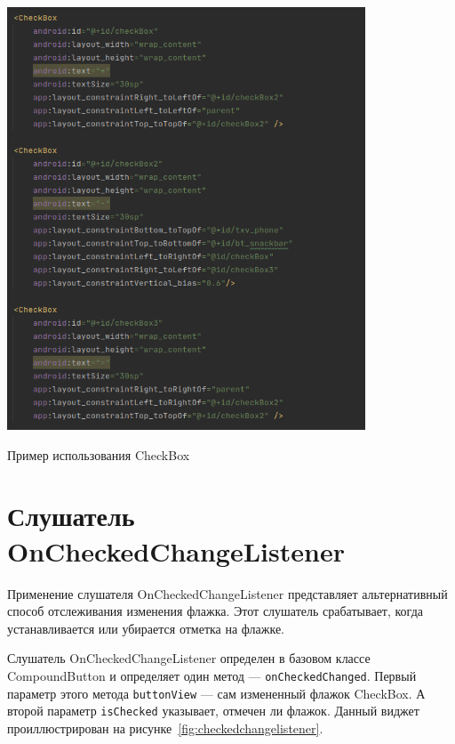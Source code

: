 \begin{image}
	\includegraphics[width=0.8\textwidth]{Screenshot from 2023-03-25 17-25-07.png}
	\caption{Пример использования CheckBox}
	\label{fig:checkbox}
\end{image}

\section{Слушатель OnCheckedChangeListener}
Применение слушателя OnCheckedChangeListener представляет
альтернативный способ отслеживания изменения флажка. Этот слушатель 
срабатывает, когда устанавливается или убирается отметка на флажке.\par
Слушатель OnCheckedChangeListener определен в базовом классе
CompoundButton и определяет один метод --- \texttt{onCheckedChanged}. Первый
параметр этого метода \texttt{buttonView} --- сам измененный флажок CheckBox.
А второй параметр \texttt{isChecked} указывает, отмечен ли флажок.
Данный виджет проиллюстрирован на рисунке~\ref{fig:checkedchangelistener}.

